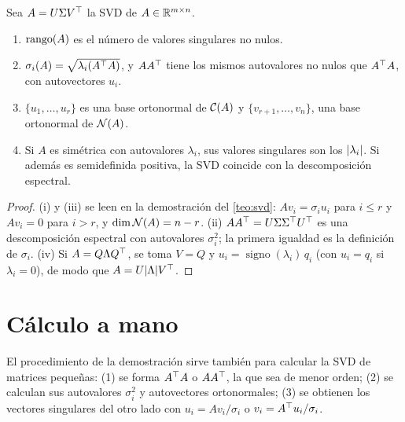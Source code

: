 \begin{corolario}\label{cor:svd-props}
Sea $A=U\Sigma V^{\top}$ la SVD de $A\in\mathbb{R}^{m\times n}$.
\begin{enumerate}
  \item $\operatorname{rango}(A)$ es el número de valores singulares no nulos.
  \item $\sigma_i(A)=\sqrt{\lambda_i(A^{\top} A)}$, y $AA^{\top}$ tiene los mismos autovalores no nulos que $A^{\top} A$, con autovectores $u_i$.
  \item $\{u_1,\dots,u_r\}$ es una base ortonormal de $\mathcal{C}(A)$ y $\{v_{r+1},\dots,v_n\}$, una base ortonormal de $\mathcal{N}(A)$.
  \item Si $A$ es simétrica con autovalores $\lambda_i$, sus valores singulares son los $\lvert\lambda_i\rvert$. Si además es semidefinida positiva, la SVD coincide con la descomposición espectral.
\end{enumerate}
\end{corolario}

\begin{proof}
(i) y (iii) se leen en la demostración del \cref{teo:svd}: $Av_i=\sigma_iu_i$ para $i\le r$ y $Av_i=0$ para $i>r$, y $\dim\mathcal{N}(A)=n-r$. (ii) $AA^{\top}=U\Sigma\Sigma^{\top} U^{\top}$ es una descomposición espectral con autovalores $\sigma_i^{2}$; la primera igualdad es la definición de $\sigma_i$. (iv) Si $A=Q\Lambda Q^{\top}$, se toma $V=Q$ y $u_i=\operatorname{signo}(\lambda_i)\,q_i$ (con $u_i=q_i$ si $\lambda_i=0$), de modo que $A=U\lvert\Lambda\rvert V^{\top}$.
\end{proof}

\section{Cálculo a mano}

El procedimiento de la demostración sirve también para calcular la SVD de matrices pequeñas: (1) se forma $A^{\top} A$ o $AA^{\top}$, la que sea de menor orden; (2) se calculan sus autovalores $\sigma_i^{2}$ y autovectores ortonormales; (3) se obtienen los vectores singulares del otro lado con $u_i=Av_i/\sigma_i$ o $v_i=A^{\top} u_i/\sigma_i$.

